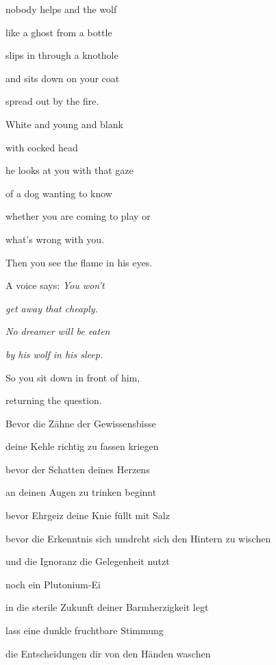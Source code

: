 nobody helps and the wolf

like a ghost from a bottle

slips in through a knothole


\bigskip

and sits down on your coat

spread out by the fire.

White and young and blank

with cocked head

he looks at you with that gaze

of a dog wanting to know

whether you are coming to play or

what's wrong with you.


\bigskip

Then you see the flame in his eyes. 

A voice says: \emph{You won't }

\emph{
get away that cheaply.}

\emph{
No dreamer will be eaten }

\emph{
by his wolf in his sleep.}


\bigskip

So you sit down in front of him,

returning the question.


\bigskip


\bigskip


\bigskip


\bigskip



\bigskip

Bevor die Zähne der Gewissensbisse

deine Kehle richtig zu fassen kriegen

bevor der Schatten deines Herzens

an deinen Augen zu trinken beginnt

bevor Ehrgeiz deine Knie füllt mit Salz

bevor die Erkenntnis sich umdreht sich den Hintern zu wischen

und die Ignoranz die Gelegenheit nutzt

noch ein Plutonium-Ei

in die sterile Zukunft deiner Barmherzigkeit legt


\bigskip

lass eine dunkle fruchtbare Stimmung

die Entscheidungen dir von den Händen waschen


